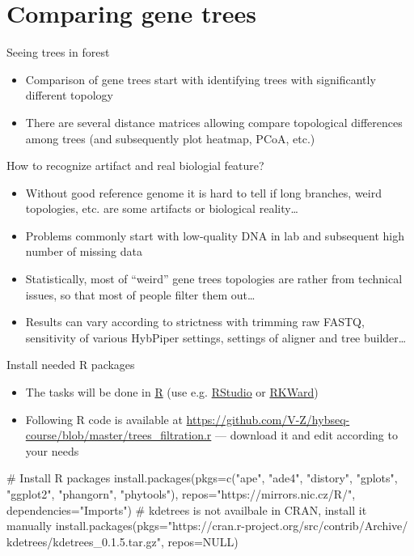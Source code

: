 \documentclass[compress, ucs, xelatex, 11pt, xcolor=x11names, aspectratio=169,
	hyperref={
		bookmarks=true,
		unicode=true,
		colorlinks=true,
		pdftitle={HybSeq course},
		plainpages=false,
		pdfauthor={Vojtech Zeisek},
		pdfsubject={Practical processing of HybSeq target enrichment sequencing data on computing grids like MetaCentrum},
		pdfcreator={XeLaTeX},
		pdfkeywords={BASH, command line, GNU, HybSeq, Linux, MetaCentrum, sequencing shell, target enrichment},
		linkcolor=Turquoise4, %
		anchorcolor=DodgerBlue4, %
		citecolor=DodgerBlue4, %
		filecolor=DodgerBlue4, %
		menucolor=Tan4, %
		urlcolor=DarkOliveGreen4, %
		pdftex},
	url={hyphens, lowtilde} %
	]{beamer}
\begin{document}
\section{Comparing gene trees}

\begin{frame}{Seeing trees in forest}
	\begin{itemize}
		\item Comparison of gene trees start with identifying trees with significantly different topology
		\item There are several distance matrices allowing compare topological differences among trees (and subsequently plot heatmap, PCoA, etc.)
	\end{itemize}
	\begin{block}{How to recognize artifact and real biologial feature?}
		\begin{itemize}
			\item Without good reference genome it is hard to tell if long branches, weird topologies, etc. are some artifacts or biological reality\ldots
			\item Problems commonly start with low-quality DNA in lab and subsequent high number of missing data
			\item Statistically, most of \enquote{weird} gene trees topologies are rather from technical issues, so that most of people filter them out\ldots
			\item Results can vary according to strictness with trimming raw FASTQ, sensitivity of various HybPiper settings, settings of aligner and tree builder\ldots
		\end{itemize}
	\end{block}
\end{frame}

\begin{frame}[fragile]{Install needed R packages}
	\begin{itemize}
		\item The tasks will be done in \href{https://www.r-project.org/}{R} (use e.g. \href{https://posit.co/products/open-source/rstudio/}{RStudio} or \href{https://rkward.kde.org/}{RKWard})
		\item Following R code is available at \url{https://github.com/V-Z/hybseq-course/blob/master/trees_filtration.r} --- download it and edit according to your needs
	\end{itemize}
	\begin{spluscode}
    # Install R packages
    install.packages(pkgs=c("ape", "ade4", "distory", "gplots", "ggplot2",
      "phangorn", "phytools"), repos="https://mirrors.nic.cz/R/",
      dependencies="Imports")
    # kdetrees is not availbale in CRAN, install it manually
    install.packages(pkgs="https://cran.r-project.org/src/contrib/Archive/
      kdetrees/kdetrees_0.1.5.tar.gz", repos=NULL)
	\end{spluscode}
\end{frame}
\end{document}
